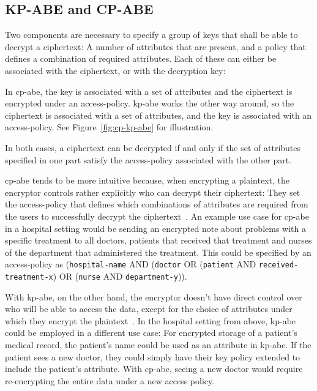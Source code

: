 \subsection{KP-ABE and CP-ABE}\label{sec:cp-vs-kp}

Two components are necessary to specify a group of keys that shall be able to decrypt a ciphertext: A number of attributes that are present, and a policy that defines a combination of required attributes. 
Each of these can either be associated with the ciphertext, or with the decryption key:

In \acrfull{cp-abe}, the key is associated with a set of attributes and the ciphertext is encrypted under an \gls{access-policy}.
\acrfull{kp-abe} works the other way around, so the ciphertext is associated with a set of attributes, and the key is associated with an \gls{access-policy}.
See Figure~\ref{fig:cp-kp-abe} for illustration.

In both cases, a ciphertext can be decrypted if and only if the set of attributes specified in one part satisfy the \gls{access-policy} associated with the other part.

\acrshort{cp-abe} tends to be more intuitive because, when encrypting a plaintext, the encryptor controls rather explicitly who can decrypt their ciphertext:
They set the \gls{access-policy} that defines which combinations of attributes are required from the users to successfully decrypt the ciphertext~\cite{bethencourt_ciphertext-policy_2007}.
An example use case for \acrshort{cp-abe} in a hospital setting would be sending an encrypted note about problems with a specific treatment to all doctors, patients that received that treatment and nurses of the department that administered the treatment.
This could be specified by an \gls{access-policy} as (\texttt{hospital-name} AND (\texttt{doctor} OR (\texttt{patient} AND \texttt{received-treatment-x}) OR (\texttt{nurse} AND \texttt{department-y})). %

With \acrshort{kp-abe}, on the other hand, the encryptor doesn't have direct control over who will be able to access the data, except for the choice of attributes under which they encrypt the plaintext~\cite{bethencourt_ciphertext-policy_2007}.
In the hospital setting from above, \acrshort{kp-abe} could be employed in a different use case: For encrypted storage of a patient's medical record, the patient's name could be used as an attribute in \acrshort{kp-abe}.
If the patient sees a new doctor, they could simply have their key policy extended to include the patient's attribute.
With \acrshort{cp-abe}, seeing a new doctor would require re-encrypting the entire data under a new access policy.

